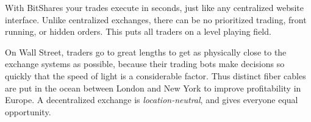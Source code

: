 With BitShares your trades execute in seconds, just like any centralized
website interface. Unlike centralized exchanges, there can be no prioritized
trading, front running, or hidden orders. This puts all traders on a level
playing field.

On Wall Street, traders go to great lengths to get as physically close to the
exchange systems as possible, because their trading bots make decisions so
quickly that the speed of light is a considerable factor. Thus distinct fiber
cables are put in the ocean between London and New York to improve
profitability in Europe. A decentralized exchange is \emph{location-neutral},
and gives everyone equal opportunity.
